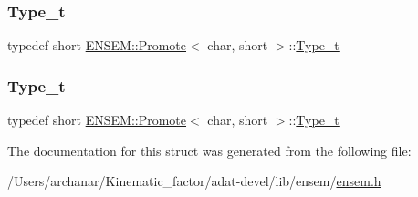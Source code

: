 \mbox{\label{structENSEM_1_1Promote_3_01char_00_01short_01_4_a4f4c8da33427bfc6c1ff6d15e8639105}} 
\subsubsection{\texorpdfstring{Type\_t}{Type\_t}\hspace{0.1cm}{\footnotesize\ttfamily [2/3]}}
{\footnotesize\ttfamily typedef short \mbox{\hyperlink{structENSEM_1_1Promote}{E\+N\+S\+E\+M\+::\+Promote}}$<$ char, short $>$\+::\mbox{\hyperlink{structENSEM_1_1Promote_3_01char_00_01short_01_4_a4f4c8da33427bfc6c1ff6d15e8639105}{Type\+\_\+t}}}

\mbox{\label{structENSEM_1_1Promote_3_01char_00_01short_01_4_a4f4c8da33427bfc6c1ff6d15e8639105}} 
\subsubsection{\texorpdfstring{Type\_t}{Type\_t}\hspace{0.1cm}{\footnotesize\ttfamily [3/3]}}
{\footnotesize\ttfamily typedef short \mbox{\hyperlink{structENSEM_1_1Promote}{E\+N\+S\+E\+M\+::\+Promote}}$<$ char, short $>$\+::\mbox{\hyperlink{structENSEM_1_1Promote_3_01char_00_01short_01_4_a4f4c8da33427bfc6c1ff6d15e8639105}{Type\+\_\+t}}}



The documentation for this struct was generated from the following file\+:\begin{DoxyCompactItemize}
\item 
/\+Users/archanar/\+Kinematic\+\_\+factor/adat-\/devel/lib/ensem/\mbox{\hyperlink{adat-devel_2lib_2ensem_2ensem_8h}{ensem.\+h}}\end{DoxyCompactItemize}
